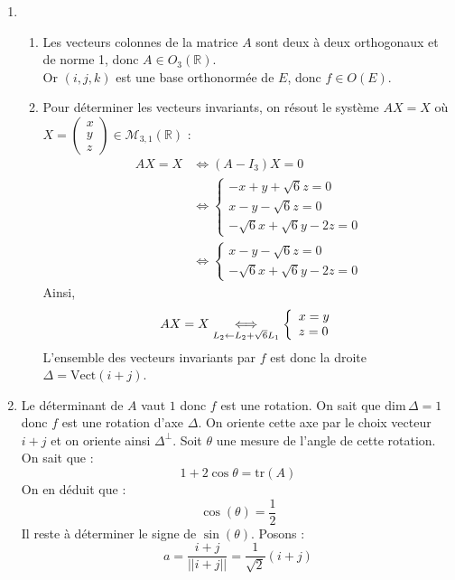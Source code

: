 \documentclass[a4paper,10pt]{report}
\begin{document}
\corr \begin{enumerate}
\item
\begin{enumerate}
\item
Les vecteurs colonnes de la matrice $A$ sont deux à deux orthogonaux et de norme 1, donc $A\in O_3(\mathbb{R})$.\\
Or $(i,j,k)$ est une base orthonormée de $E$, donc $f\in O(E)$.
\item
Pour déterminer les vecteurs invariants, on résout le système $AX=X$ où $X=\begin{pmatrix}
x\\y\\z
\end{pmatrix} \in \mathcal{M}_{3,1}(\mathbb{R})$ :
\begin{align*}
AX=X & \Longleftrightarrow(A-I_3)X=0 \\
&\Longleftrightarrow 
\left\lbrace
\begin{array}{l}
 -x+y+\sqrt{6}z=0\\
 x-y-\sqrt{6}z=0\\
 -\sqrt{6}x+\sqrt{6}y-2z=0
 \end{array}
 \right.\\
& \Longleftrightarrow 
\left\lbrace
\begin{array}{l}
 x-y-\sqrt{6}z=0\\
 -\sqrt{6}x+\sqrt{6}y-2z=0
 \end{array}
 \right. 
 \end{align*}
Ainsi,
$$AX=X\underset{\begin{tiny}L_2\leftarrow L_2+\sqrt{6}L_1\end{tiny}}{\Longleftrightarrow}
 \left\lbrace
\begin{array}{l}
x=y\\
z=0
 \end{array}
 \right. $$
L'ensemble des vecteurs invariants par $f$ est donc la droite $\Delta=\mathrm{Vect}(i+j)$.
\end{enumerate}
\item Le déterminant de $A$ vaut $1$ donc $f$ est une rotation. On sait que $\mathrm{dim}\,\Delta=1$ donc $f$ est une rotation d'axe $\Delta$. On oriente cette axe par le choix vecteur $i+j$ et on oriente ainsi $\Delta^{\perp}$. Soit $\theta$ une mesure de l'angle de cette rotation. On sait que :
$$ 1+2\cos\theta=\mathrm{tr}(A)$$
On en déduit que :
$$\cos(\theta)=\frac{1}{2}$$
Il reste à déterminer le signe de $\sin (\theta)$.
Posons :
$$a =\dfrac{i+j}{||i+j||}=\frac{1}{\sqrt{2}}(i+j)$$

\end{enumerate}
\end{document}
